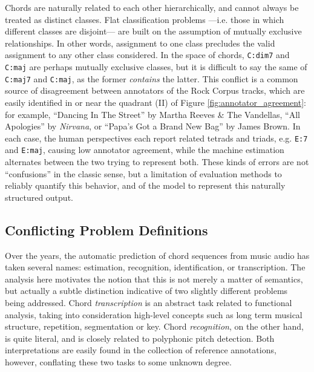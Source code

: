 \documentclass{article}
\begin{document}
Chords are naturally related to each other hierarchically, and cannot always be treated as distinct classes.
Flat classification problems ---i.e. those in which different classes are disjoint--- are built on the assumption of mutually exclusive relationships.
In other words, assignment to one class precludes the valid assignment to any other class considered.
In the space of chords, \texttt{C:dim7} and \texttt{C:maj} are perhaps mutually exclusive classes, but it is difficult to say the same of \texttt{C:maj7} and \texttt{C:maj}, as the former \emph{contains} the latter.
This conflict is a common source of disagreement between annotators of the Rock Corpus tracks, which are easily identified in or near the quadrant (II) of Figure \ref{fig:annotator_agreement}:
for example, ``Dancing In The Street'' by Martha Reeves \& The Vandellas, ``All Apologies'' by \emph{Nirvana}, or ``Papa's Got a Brand New Bag'' by James Brown.
In each case, the human perspectives each report related tetrads and triads, e.g. \texttt{E:7} and \texttt{E:maj}, causing low annotator agreement, while the machine estimation alternates between the two trying to represent both.
These kinds of errors are not ``confusions'' in the classic sense, but a limitation of evaluation methods to reliably quantify this behavior, and of the model to represent this naturally structured output.




\subsection{Conflicting Problem Definitions}

Over the years, the automatic prediction of chord sequences from music audio has taken several names: estimation, recognition, identification, or transcription.
The analysis here motivates the notion that this is not merely a matter of semantics, but actually a subtle distinction indicative of two slightly different problems being addressed.
Chord \emph{transcription} is an abstract task related to functional analysis, taking into consideration high-level concepts such as long term musical structure, repetition, segmentation or key.
Chord \emph{recognition}, on the other hand, is quite literal, and is closely related to polyphonic pitch detection.
Both interpretations are easily found in the collection of reference annotations, however, conflating these two tasks to some unknown degree.
\end{document}
